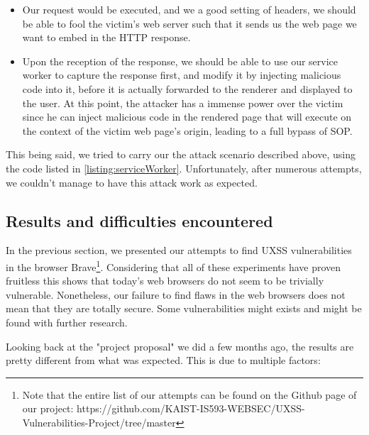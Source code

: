 \documentclass[journal]{IEEEtran}
\begin{document}
\begin{itemize}
\item Our request would be executed, and we a good setting of headers, we should be able to fool the victim's web server such that it sends us the web page we want to embed in the HTTP response.
\item Upon the reception of the response, we should be able to use our service worker to capture the response first, and modify it by injecting malicious code into it, before it is actually forwarded to the renderer and displayed to the user. At this point, the attacker has a immense power over the victim since he can inject malicious code in the rendered page that will execute on the context of the victim web page's origin, leading to a full bypass of SOP.
\end{itemize}

\medskip

This being said, we tried to carry our the attack scenario described above, using the code listed in \ref{listing:serviceWorker}. Unfortunately, after numerous attempts, we couldn't manage to have this attack work as expected. 


\subsection{Results and difficulties encountered}

In the previous section, we presented our attempts to find UXSS vulnerabilities in the browser Brave\footnote{Note that the entire list of our attempts can be found on the Github page of our project: https://github.com/KAIST-IS593-WEBSEC/UXSS-Vulnerabilities-Project/tree/master}. Considering that all of these experiments have proven fruitless this shows that today's web browsers do not seem to be trivially vulnerable. Nonetheless, our failure to find flaws in the web browsers does not mean that they are totally secure. Some vulnerabilities might exists and might be found with further research. 

\medskip

Looking back at the "project proposal" we did a few months ago, the results are pretty different from what was expected. This is due to multiple factors:
\end{document}
